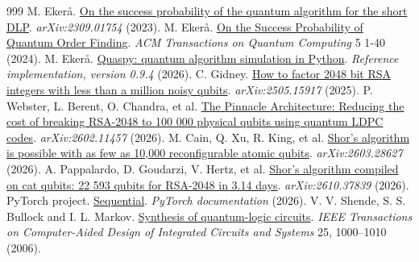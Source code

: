 \begin{thebibliography}{999}
 M. Ekerå. \href{https://arxiv.org/abs/2309.01754}{On the success probability of the quantum algorithm for the short DLP}. \emph{arXiv:2309.01754}  (2023).
 M. Ekerå. \href{https://doi.org/10.1145/3655026}{On the Success Probability of Quantum Order Finding}. \emph{ACM Transactions on Quantum Computing} 5 1-40 (2024).
 M. Ekerå. \href{https://github.com/ekera/quaspy}{Quaspy: quantum algorithm simulation in Python}. \emph{Reference implementation, version 0.9.4}  (2026).
 C. Gidney. \href{https://arxiv.org/abs/2505.15917}{How to factor 2048 bit RSA integers with less than a million noisy qubits}. \emph{arXiv:2505.15917}  (2025).
 P. Webster, L. Berent, O. Chandra, et al. \href{https://arxiv.org/abs/2602.11457}{The Pinnacle Architecture: Reducing the cost of breaking RSA-2048 to 100 000 physical qubits using quantum LDPC codes}. \emph{arXiv:2602.11457}  (2026).
 M. Cain, Q. Xu, R. King, et al. \href{https://arxiv.org/abs/2603.28627}{Shor's algorithm is possible with as few as 10,000 reconfigurable atomic qubits}. \emph{arXiv:2603.28627}  (2026).
 A. Pappalardo, D. Goudarzi, V. Hertz, et al. \href{https://arxiv.org/abs/2610.37839}{Shor's algorithm compiled on cat qubits: 22 593 qubits for RSA-2048 in 3.14 days}. \emph{arXiv:2610.37839}  (2026).
 PyTorch project. \href{https://docs.pytorch.org/docs/stable/generated/torch.nn.Sequential.html}{Sequential}. \emph{PyTorch documentation}  (2026).
 V. V. Shende, S. S. Bullock and I. L. Markov. \href{https://doi.org/10.1109/TCAD.2005.855930}{Synthesis of quantum-logic circuits}. \emph{IEEE Transactions on Computer-Aided Design of Integrated Circuits and Systems} 25, 1000--1010 (2006).
\end{thebibliography}
